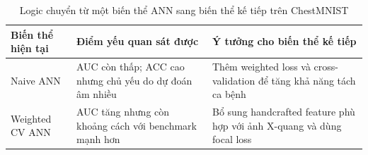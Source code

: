 \begin{table}[H]
\centering
\caption{Logic chuyển từ một biến thể ANN sang biến thể kế tiếp trên ChestMNIST}
\label{tab:chestmnist-ann-iteration-logic}
\small
\begin{tabularx}{\textwidth}{>{\raggedright\arraybackslash}p{3.2cm} >{\raggedright\arraybackslash}X >{\raggedright\arraybackslash}X}
\toprule
Biến thể hiện tại & Điểm yếu quan sát được & Ý tưởng cho biến thể kế tiếp \\
\midrule
Naive ANN & AUC còn thấp; ACC cao nhưng chủ yếu do dự đoán âm nhiều & Thêm weighted loss và cross-validation để tăng khả năng tách ca bệnh \\
Weighted CV ANN & AUC tăng nhưng còn khoảng cách với benchmark mạnh hơn & Bổ sung handcrafted feature phù hợp với ảnh X-quang và dùng focal loss \\
\bottomrule
\end{tabularx}
\end{table}
